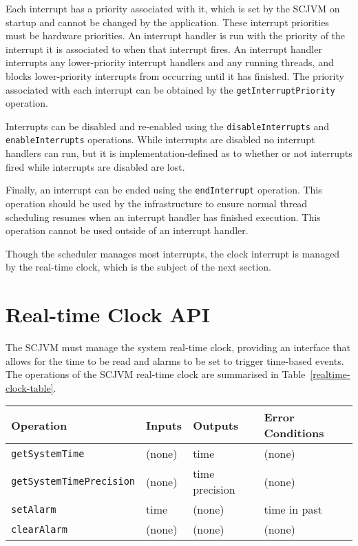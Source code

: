 Each interrupt has a priority associated with it, which is set by the
SCJVM on startup and cannot be changed by the application.
These interrupt priorities must be hardware priorities.
An interrupt handler is run with the priority of the interrupt it is
associated to when that interrupt fires.
An interrupt handler interrupts any lower-priority interrupt handlers
and any running threads, and blocks lower-priority interrupts from
occurring until it has finished.
The priority associated with each interrupt can be obtained by the
\texttt{get\-Interrupt\-Priority} operation.

Interrupts can be disabled and re-enabled using the
\texttt{disableInterrupts} and \texttt{enableInterrupts} operations.
While interrupts are disabled no interrupt handlers can run, but it is
implementation-defined as to whether or not interrupts fired while
interrupts are disabled are lost.

Finally, an interrupt can be ended using the \texttt{end\-Interrupt}
operation.
This operation should be used by the infrastructure to ensure normal
thread scheduling resumes when an interrupt handler has finished
execution.
This operation cannot be used outside of an interrupt handler.

Though the scheduler manages most interrupts, the clock interrupt is
managed by the real-time clock, which is the subject of the next section.

\section{Real-time Clock API}
\label{realtime-clock-section}

The SCJVM must manage the system real-time clock, providing an
interface that allows for the time to be read and alarms to be set to
trigger time-based events.
The operations of the SCJVM real-time clock are summarised in
Table~\ref{realtime-clock-table}.

\begin{table*}[ht]
  \centering
  \footnotesize
  \begin{tabular}{|l|p{1.2cm}|p{2cm}|p{2.6cm}|}
    Operation & Inputs & Outputs & Error Conditions \\
    \hline
    \texttt{getSystemTime} &
    (none) &
    time &
    (none)
    \\\texttt{getSystemTimePrecision} &
    (none) &
    time precision &
    (none)
    \\\texttt{setAlarm} &
    time &
    (none) &
    time in past
    \\\texttt{clearAlarm} &
    (none) &
    (none) &
    (none)
  \end{tabular}
  \caption{The operations of the SCJVM real-time clock}
  \label{realtime-clock-table}
\end{table*}

